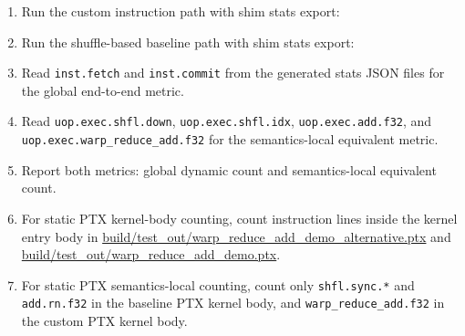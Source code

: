 \documentclass[11pt]{article}
\newenvironment{Shaded}{}{}
\newcommand{\DataTypeTok}[1]{\textcolor[rgb]{0.56,0.13,0.00}{#1}}
\newcommand{\FunctionTok}[1]{\textcolor[rgb]{0.02,0.16,0.49}{#1}}
\newcommand{\NormalTok}[1]{#1}
\newcommand{\OperatorTok}[1]{\textcolor[rgb]{0.40,0.40,0.40}{#1}}
\newcommand{\VariableTok}[1]{\textcolor[rgb]{0.10,0.09,0.49}{#1}}
\begin{document}
\begin{enumerate}
\def\labelenumi{\arabic{enumi}.}
\item
  Run the custom instruction path with shim stats export:

\begin{Shaded}
\end{Shaded}
\item
  Run the shuffle-based baseline path with shim stats export:

\begin{Shaded}
\end{Shaded}
\item
  Read \texttt{inst.fetch} and \texttt{inst.commit} from the generated
  stats JSON files for the global end-to-end metric.
\item
  Read \texttt{uop.exec.shfl.down}, \texttt{uop.exec.shfl.idx},
  \texttt{uop.exec.add.f32}, and \texttt{uop.exec.warp\_reduce\_add.f32}
  for the semantics-local equivalent metric.
\item
  Report both metrics: global dynamic count and semantics-local
  equivalent count.
\item
  For static PTX kernel-body counting, count instruction lines inside
  the kernel entry body in
  \url{build/test_out/warp_reduce_add_demo_alternative.ptx} and
  \url{build/test_out/warp_reduce_add_demo.ptx}.
\item
  For static PTX semantics-local counting, count only
  \texttt{shfl.sync.*} and \texttt{add.rn.f32} in the baseline PTX
  kernel body, and \texttt{warp\_reduce\_add.f32} in the custom PTX
  kernel body.
\end{enumerate}
\end{document}
